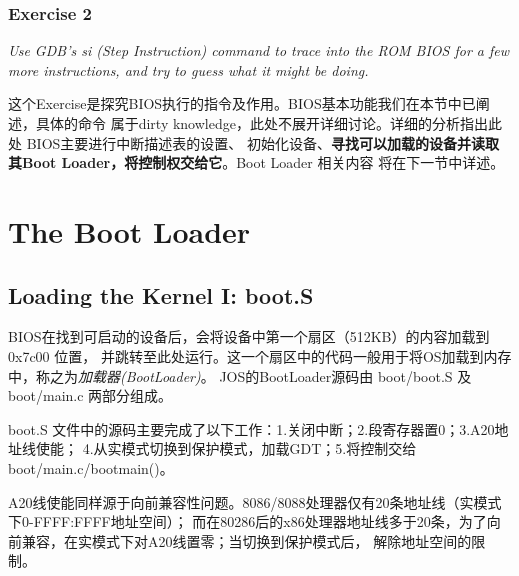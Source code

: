 \documentclass[12pt, letterpaper]{report}
\begin{document}
\subsection{\large Exercise 2}
\textsl{Use GDB's si (Step Instruction) command
         to trace into the ROM BIOS for a few more instructions, 
         and try to guess what it might be doing. } \par 
\quad \par 
这个Exercise是探究BIOS执行的指令及作用。BIOS基本功能我们在本节中已阐述，具体的命令
属于dirty knowledge，此处不展开详细讨论。详细的分析指出此处 BIOS主要进行中断描述表的设置、
初始化设备、\textbf{寻找可以加载的设备并读取其Boot Loader，将控制权交给它}。Boot Loader 相关内容
将在下一节中详述。


\chapter[\Large The Boot Loader]{The Boot Loader}
\section[\large Loading the Kernel I: boot.S]{Loading the Kernel I: boot.S}
BIOS在找到可启动的设备后，会将设备中第一个扇区（512KB）的内容加载到 0x7c00 位置，
并跳转至此处运行。这一个扇区中的代码一般用于将OS加载到内存中，称之为\textsl{加载器(BootLoader)}。
JOS的BootLoader源码由 boot/boot.S 及 boot/main.c 两部分组成。 \par

boot.S 文件中的源码主要完成了以下工作：1.关闭中断；2.段寄存器置0；3.A20地址线使能；
4.从实模式切换到保护模式，加载GDT；5.将控制交给 boot/main.c/bootmain()。 \par

A20线使能同样源于向前兼容性问题。8086/8088处理器仅有20条地址线（实模式下0-FFFF:FFFF地址空间）；
而在80286后的x86处理器地址线多于20条，为了向前兼容，在实模式下对A20线置零；当切换到保护模式后，
解除地址空间的限制。\par 
\end{document}
